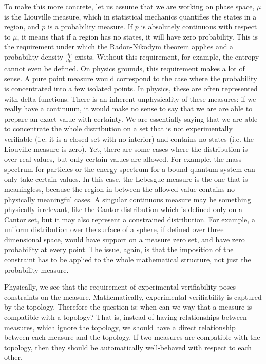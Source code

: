 To make this more concrete, let us assume that we are working on phase space, $\mu$ is the Liouville measure, which in statistical mechanics quantifies the states in a region, and $p$ is a probability measure. If $p$ is absolutely continuous with respect to $\mu$, it means that if a region has no states, it will have zero probability. This is the requirement under which the \href{https://en.wikipedia.org/wiki/Radon%E2%80%93Nikodym_theorem}{Radon-Nikodym theorem} applies and a probability density $\frac{dp}{d\mu}$ exists. Without this requirement, for example, the entropy cannot even be defined. On physics grounds, this requirement makes a lot of sense. A pure point measure would correspond to the case where the probability is concentrated into a few isolated points. In physics, these are often represented with delta functions. There is an inherent unphysicality of these measures: if we really have a continuum, it would make no sense to say that we are are able to prepare an exact value with certainty. We are essentially saying that we are able to concentrate the whole distribution on a set that is not experimentally verifiable (i.e. it is a closed set with no interior) and contains no states (i.e. the Liouville measure is zero). Yet, there are some cases where the distribution is over real values, but only certain values are allowed. For example, the mass spectrum for particles or the energy spectrum for a bound quantum system can only take certain values. In this case, the Lebesgue measure is the one that is meaningless, because the region in between the allowed value contains no physically meaningful cases. A singular continuous measure may be something physically irrelevant, like the \href{https://en.wikipedia.org/wiki/Cantor_distribution}{Cantor distribution} which is defined only on a Cantor set, but it may also represent a constrained distribution. For example, a uniform distribution over the surface of a sphere, if defined over three dimensional space, would have support on a measure zero set, and have zero probability at every point. The issue, again, is that the imposition of the constraint has to be applied to the whole mathematical structure, not just the probability measure.

Physically, we see that the requirement of experimental verifiability poses constraints on the measure. Mathematically, experimental verifiability is captured by the topology. Therefore the question is: when can we way that a measure is compatible with a topology? That is, instead of having relationships between measures, which ignore the topology, we should have a direct relationship between each measure and the topology. If two measures are compatible with the topology, then they should be automatically well-behaved with respect to each other.

